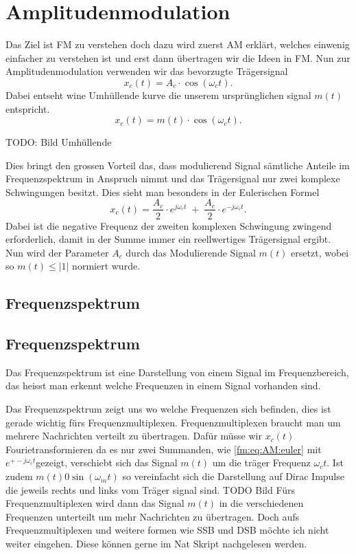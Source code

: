 %
%
%
\section{Amplitudenmodulation\label{fm:section:teil0}}

Das Ziel ist FM zu verstehen doch dazu wird zuerst AM erklärt, welches einwenig einfacher zu verstehen ist und erst dann übertragen wir die Ideen in FM.
Nun zur Amplitudenmodulation verwenden wir das bevorzugte Trägersignal
\[
    x_c(t) = A_c \cdot \cos(\omega_ct).
\]
Dabei entseht wine Umhüllende kurve die unserem ursprünglichen signal \(m(t)\) entspricht.
\[
    x_c(t) = m(t) \cdot \cos(\omega_ct).
\]

TODO: Bild Umhüllende


Dies bringt den grossen Vorteil das, dass modulierend Signal sämtliche Anteile im Frequenzspektrum in Anspruch nimmt 
und das Trägersignal nur zwei komplexe Schwingungen besitzt. 
Dies sieht man besonders in der Eulerischen Formel
\[
    x_c(t) = \frac{A_c}{2} \cdot e^{j\omega_ct}\;+\;\frac{A_c}{2} \cdot e^{-j\omega_ct}.
    \label{fm:eq:AM:euler}
\]
Dabei ist die negative Frequenz der zweiten komplexen Schwingung zwingend erforderlich, damit in der Summe immer ein reellwertiges Trägersignal ergibt.
Nun wird der Parameter \(A_c\) durch das  Modulierende Signal \(m(t)\) ersetzt, wobei so \(m(t) \leqslant |1|\) normiert wurde.

\subsection{Frequenzspektrum}
\subsection{Frequenzspektrum}
Das Frequenzspektrum ist eine Darstellung von einem Signal im Frequenzbereich, das heisst man erkennt welche Frequenzen in einem Signal vorhanden sind.

Das Frequenzspektrum zeigt uns wo welche Frequenzen sich befinden, dies ist gerade wichtig fürs Frequenzmultiplexen.
Frequenzmultiplexen braucht man um mehrere Nachrichten verteilt zu übertragen.
Dafür müsse wir \(x_c(t)\) Fourietransformieren da es nur zwei Summanden, wie \eqref{fm:eq:AM:euler} mit \(e^{+-j\omega_ct}\)gezeigt, verschiebt sich das Signal \(m(t)\) um die träger Frequenz \(\omega_ct\).
Ist zudem \(m(t) 0 \sin(\omega_m t)\) so vereinfacht sich die Darstellung auf Dirac Impulse die jeweils rechts und links vom Träger signal sind.
TODO Bild 
Fürs Frequenzmultiplexen wird dann das Signal \(m(t)\) in die verschiedenen Frequenzen unterteilt um mehr Nachrichten zu übertragen.
Doch aufs Frequenzmultiplexen und weitere formen wie SSB und DSB möchte ich nicht weiter eingehen.
Diese können gerne im Nat Skript nachgelesen werden.

